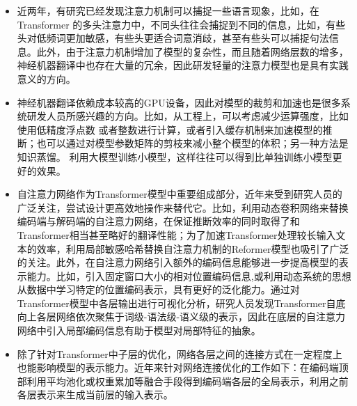 \begin{itemize}
\vspace{0.5em}
\item 近两年，有研究已经发现注意力机制可以捕捉一些语言现象，比如，在Transformer 的多头注意力中，不同头往往会捕捉到不同的信息，比如，有些头对低频词更加敏感，有些头更适合词意消歧，甚至有些头可以捕捉句法信息。此外，由于注意力机制增加了模型的复杂性，而且随着网络层数的增多，神经机器翻译中也存在大量的冗余，因此研发轻量的注意力模型也是具有实践意义的方向。
\vspace{0.5em}
\item 神经机器翻译依赖成本较高的GPU设备，因此对模型的裁剪和加速也是很多系统研发人员所感兴趣的方向。比如，从工程上，可以考虑减少运算强度，比如使用低精度浮点数 或者整数进行计算，或者引入缓存机制来加速模型的推断；也可以通过对模型参数矩阵的剪枝来减小整个模型的体积；另一种方法是知识蒸馏。 利用大模型训练小模型，这样往往可以得到比单独训练小模型更好的效果。
\vspace{0.5em}
\item 自注意力网络作为Transformer模型中重要组成部分，近年来受到研究人员的广泛关注，尝试设计更高效地操作来替代它。比如，利用动态卷积网络来替换编码端与解码端的自注意力网络，在保证推断效率的同时取得了和Transformer相当甚至略好的翻译性能；为了加速Transformer处理较长输入文本的效率，利用局部敏感哈希替换自注意力机制的Reformer模型也吸引了广泛的关注。此外，在自注意力网络引入额外的编码信息能够进一步提高模型的表示能力。比如，引入固定窗口大小的相对位置编码信息,或利用动态系统的思想从数据中学习特定的位置编码表示，具有更好的泛化能力。通过对Transformer模型中各层输出进行可视化分析，研究人员发现Transformer自底向上各层网络依次聚焦于词级-语法级-语义级的表示，因此在底层的自注意力网络中引入局部编码信息有助于模型对局部特征的抽象。
\vspace{0.5em}
\item 除了针对Transformer中子层的优化，网络各层之间的连接方式在一定程度上也能影响模型的表示能力。近年来针对网络连接优化的工作如下：在编码端顶部利用平均池化或权重累加等融合手段得到编码端各层的全局表示，利用之前各层表示来生成当前层的输入表示。
\end{itemize}
